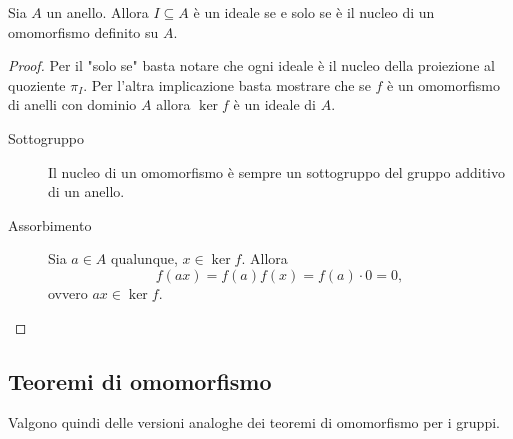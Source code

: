 \begin{proposition}
    Sia $A$ un anello. Allora $I \subseteq A$ è un ideale se e solo se è il nucleo di un omomorfismo definito su $A$.
\end{proposition}
\begin{proof}
    Per il "solo se" basta notare che ogni ideale è il nucleo della proiezione al quoziente $\pi_I$. Per l'altra implicazione basta mostrare che se $f$ è un omomorfismo di anelli con dominio $A$ allora $\ker f$ è un ideale di $A$.
    \begin{description}
        \item[Sottogruppo] Il nucleo di un omomorfismo è sempre un sottogruppo del gruppo additivo di un anello.
        \item[Assorbimento] Sia $a \in A$ qualunque, $x \in \ker f$. Allora \[
            f(ax) = f(a)f(x) = f(a) \cdot 0 = 0,    
        \] ovvero $ax \in \ker f$. \qedhere
    \end{description}
\end{proof}

\subsection{Teoremi di omomorfismo}

Valgono quindi delle versioni analoghe dei teoremi di omomorfismo per i gruppi.

